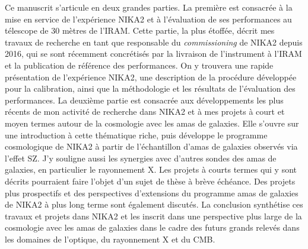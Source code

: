



Ce manuscrit s'articule en deux grandes parties. La première est
consacrée à la mise en service de l'expérience NIKA2 et à l'évaluation
de ses performances au télescope de 30 mètres de l'IRAM. Cette partie,
la plus étoffée, décrit mes travaux de recherche en tant que
responsable du \emph{commissioning} de NIKA2 depuis 2016, qui se sont
récemment concrétisés par la livraison de l'instrument à l'IRAM et la
publication de référence des performances. On y trouvera une rapide
présentation de l'expérience NIKA2, une description de la procédure
développée pour la calibration, ainsi que la méthodologie et les
résultats de l'évaluation des performances.
La deuxième partie est consacrée aux développements les plus récents
de mon activité de recherche dans NIKA2 et à mes projets à court et
moyen termes autour de la cosmologie avec les amas de galaxies. Elle
s'ouvre sur une introduction à cette thématique riche, puis développe
le programme cosmologique de NIKA2 à partir de l'échantillon d'amas de
galaxies observés via l'effet SZ. J'y souligne aussi les synergies avec
d'autres sondes des amas de galaxies, en particulier le rayonnement
X. Les projets à courts termes qui y sont décrits pourraient faire
l'objet d'un sujet de thèse à brève échéance. Des projets plus
prospectifs et des perspectives d'extensions du programme amas de
galaxies de NIKA2 à plus long terme sont également
discutés. La conclusion synthétise ces travaux et projets dans NIKA2
et les inscrit dans une perspective plus large de la cosmologie avec
les amas de galaxies dans le cadre des futurs grands relevés dans les domaines de l'optique, du rayonnement X et du CMB.  







